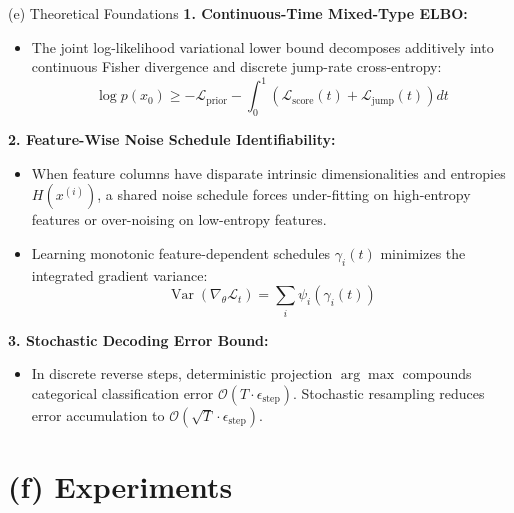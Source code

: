 \documentclass[aspectratio=169, 10pt]{beamer}
\begin{document}
\begin{frame}{(e) Theoretical Foundations}
  \textbf{1. Continuous-Time Mixed-Type ELBO:}
  \begin{itemize}
    \item The joint log-likelihood variational lower bound decomposes additively into continuous Fisher divergence and discrete jump-rate cross-entropy:
    $$\log p(x_0) \ge - \mathcal{L}_{\text{prior}} - \int_0^1 \left( \mathcal{L}_{\text{score}}(t) + \mathcal{L}_{\text{jump}}(t) \right) dt$$
  \end{itemize}
  \vspace{0.2cm}
  \textbf{2. Feature-Wise Noise Schedule Identifiability:}
  \begin{itemize}
    \item When feature columns have disparate intrinsic dimensionalities and entropies $H(x^{(i)})$, a shared noise schedule forces under-fitting on high-entropy features or over-noising on low-entropy features.
    \item Learning monotonic feature-dependent schedules $\gamma_i(t)$ minimizes the integrated gradient variance:
    $$\operatorname{Var}\left( \nabla_\theta \mathcal{L}_t \right) = \sum_{i} \psi_i(\gamma_i(t))$$
  \end{itemize}
  \vspace{0.2cm}
  \textbf{3. Stochastic Decoding Error Bound:}
  \begin{itemize}
    \item In discrete reverse steps, deterministic projection $\arg\max$ compounds categorical classification error $\mathcal{O}(T \cdot \epsilon_{\text{step}})$. Stochastic resampling reduces error accumulation to $\mathcal{O}(\sqrt{T} \cdot \epsilon_{\text{step}})$.
  \end{itemize}
\end{frame}

\section{(f) Experiments}
\end{document}
